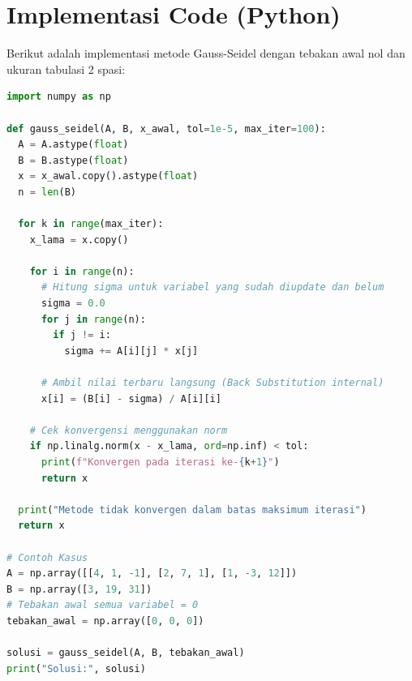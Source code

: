 \documentclass[12pt, lettersize, journal]{article}
\begin{document}
\section{Implementasi Code (Python)}
Berikut adalah implementasi metode Gauss-Seidel dengan tebakan awal nol dan ukuran tabulasi 2 spasi:

\begin{lstlisting}[language=Python, caption=Implementasi Iterasi Gauss-Seidel]
import numpy as np

def gauss_seidel(A, B, x_awal, tol=1e-5, max_iter=100):
  A = A.astype(float)
  B = B.astype(float)
  x = x_awal.copy().astype(float)
  n = len(B)
  
  for k in range(max_iter):
    x_lama = x.copy()
    
    for i in range(n):
      # Hitung sigma untuk variabel yang sudah diupdate dan belum
      sigma = 0.0
      for j in range(n):
        if j != i:
          sigma += A[i][j] * x[j]
          
      # Ambil nilai terbaru langsung (Back Substitution internal)
      x[i] = (B[i] - sigma) / A[i][i]
      
    # Cek konvergensi menggunakan norm
    if np.linalg.norm(x - x_lama, ord=np.inf) < tol:
      print(f"Konvergen pada iterasi ke-{k+1}")
      return x
      
  print("Metode tidak konvergen dalam batas maksimum iterasi")
  return x

# Contoh Kasus
A = np.array([[4, 1, -1], [2, 7, 1], [1, -3, 12]])
B = np.array([3, 19, 31])
# Tebakan awal semua variabel = 0
tebakan_awal = np.array([0, 0, 0])

solusi = gauss_seidel(A, B, tebakan_awal)
print("Solusi:", solusi)
\end{lstlisting}
\end{document}
